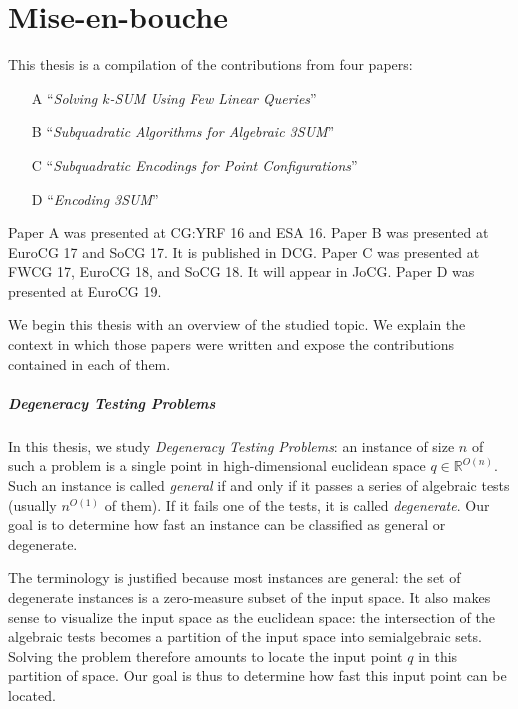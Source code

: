 \chapter{Mise-en-bouche}

This thesis is a compilation of the contributions from four papers:
%
\begin{enumerate}
	\item[A] ``\emph{Solving \(k\)-SUM Using Few Linear Queries}''~\cite{CIO16}
	\item[B] ``\emph{Subquadratic Algorithms for Algebraic 3SUM}''~\cite{BCILOS19}
	\item[C] ``\emph{Subquadratic Encodings for Point Configurations}''~\cite{CCILO19}
	\item[D] ``\emph{Encoding 3SUM}''~\cite{CCILMO19}
\end{enumerate}
%
Paper A was presented at CG:YRF 16 and ESA 16.
%
Paper B was presented at EuroCG 17 and SoCG 17. It is published in DCG.
%
Paper C was presented at FWCG 17, EuroCG 18, and SoCG 18. It will appear in JoCG.
%
Paper D was presented at EuroCG 19.

We begin this thesis with an overview of the studied topic.
%
We explain the context in which those papers were written and expose
the contributions contained in each of them.

\paragraph{Degeneracy Testing Problems}
%
In this thesis,
we study \emph{Degeneracy Testing Problems}:
an instance of size \(n\) of such a problem is a single point in
high-dimensional euclidean space \(q \in \mathbb{R}^{O(n)}\). Such an instance
is called \emph{general} if and only if it passes a series of algebraic tests
(usually \(n^{O(1)}\) of them). If it fails one of the tests, it is
called \emph{degenerate}.
%
Our goal is to determine how fast an instance can be classified as general or
degenerate.

The terminology is justified because most instances
are general: the set of degenerate instances is a zero-measure subset of the
input space. It also makes sense to visualize the input space as the euclidean
space: the intersection of the algebraic tests becomes a partition of
the input space into semialgebraic sets. Solving the problem therefore amounts
to locate the input point \(q\) in this partition of space. Our goal
is thus to determine how fast this input point can be located.

